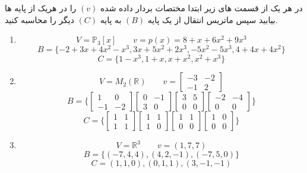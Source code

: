 \documentclass{article}
\begin{document}
 در هر یک از قسمت های زیر ابتدا مختصات بردار داده شده
$(v)$ 
را در هریک از پایه ها بیابید سپس ماتریس انتقال از یک پایه
$(B)$
به پایه
$(C)$
دیگر را محاسبه کنید.
\begin{enumerate}
	\item 
	$$V=\mathbb{P}_3[x]\qquad v=p(x)=8+x+6x^2+9x^3$$
	$$B=\{−2+3x+4x^2-x^3, 3x+5x^2+2x^3, -5x^2-5x^3,
	4 + 4x + 4x^2\}$$
	$$C=\{1 - x^3, 1 + x, x + x^2, x^2 + x^3\}$$
	\item 
	$$V=M_2(\mathbb{R})\qquad v=\begin{bmatrix}
	-3&-2\\
	-1&2
	\end{bmatrix}
	$$
	$$B=\{
	\begin{bmatrix}
	1&0\\
	-1&-2
	\end{bmatrix}
	\begin{bmatrix}
	0&-1\\
	3&0
	\end{bmatrix}
	\begin{bmatrix}
	3&5\\
	0&0
	\end{bmatrix}
	\begin{bmatrix}
	-2&-4\\
	0&0
	\end{bmatrix}
	\}$$
	$$C=\{
	\begin{bmatrix}
	1&1\\
	1&1
	\end{bmatrix}
	\begin{bmatrix}
	1&1\\
	1&0
	\end{bmatrix}
	\begin{bmatrix}
	1&1\\
	0&0
	\end{bmatrix}
	\begin{bmatrix}
	1&0\\
	0&0
	\end{bmatrix}
	\}$$
	\item
	$$V=\mathbb{R}^3\qquad v=(1,7,7)$$
	$$B=\{(-7,4,4),(4,2,-1),(-7,5,0)\}$$
	$$C={(1,1,0),(0,1,1),(3,-1,-1)}$$
\end{enumerate}
\end{document}
